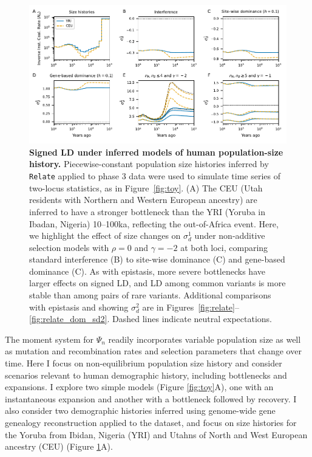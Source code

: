\documentclass[]{article}
\begin{document}
\begin{figure}[tb!]
    \internallinenumbers
    \centering
    \includegraphics{../figures/demog_YRI_CEU.dominance}
    \caption{
        \textbf{Signed LD under inferred models of human population-size history.}
        Piecewise-constant population size histories inferred by \texttt{Relate} applied to
        \citet{1000_Genomes_Project_Consortium2015-zq} phase 3 data were used to
        simulate time series of two-locus statistics, as in Figure~\ref{fig:toy}.
        (A) The CEU (Utah residents with Northern and Western European ancestry)
        are inferred to have a stronger bottleneck than the YRI
        (Yoruba in Ibadan, Nigeria) 10--100ka, reflecting the out-of-Africa
        event.
        Here, we highlight the effect of size changes on \(\sigma_d^1\) under
        non-additive selection models with \(\rho=0\) and \(\gamma=-2\) at both loci,
        comparing standard interference (B) to site-wise dominance (C) and gene-based
        dominance (C).
        As with epistasis, more severe bottlenecks have larger effects on signed LD,
        and LD among common variants is more stable than among pairs of rare variants.
        Additional comparisons with epistasis and showing \(\sigma_d^2\) are
        in Figures~\ref{fig:relate}--\ref{fig:relate_dom_sd2}.
        Dashed lines indicate neutral expectations.
    }
    \label{fig:relate_dom}
\end{figure}

The moment system for \(\Psi_n\) readily incorporates variable population size as
well as mutation and recombination rates and selection parameters that change
over time. Here I focus on non-equilibrium population size history and consider
scenarios relevant to human demographic history, including bottlenecks and
expansions. I explore two simple models (Figure \ref{fig:toy}A), one with an
instantaneous expansion and another with a bottleneck followed by recovery. I
also consider two demographic histories inferred using genome-wide gene
genealogy reconstruction \citep{Speidel2019-nj} applied to the
\citet{1000_Genomes_Project_Consortium2015-zq} dataset, and focus on size histories
for the Yoruba from Ibidan, Nigeria (YRI) and Utahns of North and West European
ancestry (CEU) (Figure \ref{fig:relate_dom}A).
\end{document}
